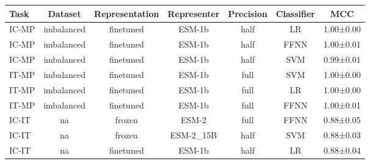 \begin{tabular}{lcccccc}
\toprule
 \textbf{Task} &    \textbf{Dataset} & \textbf{Representation} & \textbf{Representer} & \textbf{Precision} & \textbf{Classifier} &       \textbf{MCC} \\
\midrule
IC-MP & imbalanced &      finetuned &      ESM-1b &      half &         LR & 1.00±0.00 \\
IC-MP & imbalanced &      finetuned &      ESM-1b &      half &       FFNN & 1.00±0.01 \\
IC-MP & imbalanced &      finetuned &      ESM-1b &      half &        SVM & 0.99±0.01 \\
IT-MP & imbalanced &      finetuned &      ESM-1b &      full &        SVM & 1.00±0.00 \\
IT-MP & imbalanced &      finetuned &      ESM-1b &      full &         LR & 1.00±0.00 \\
IT-MP & imbalanced &      finetuned &      ESM-1b &      full &       FFNN & 1.00±0.01 \\
IC-IT &         na &         frozen &       ESM-2 &      full &       FFNN & 0.88±0.05 \\
IC-IT &         na &         frozen &   ESM-2\_15B &      half &        SVM & 0.88±0.03 \\
IC-IT &         na &      finetuned &      ESM-1b &      half &         LR & 0.88±0.04 \\
\bottomrule
\end{tabular}

